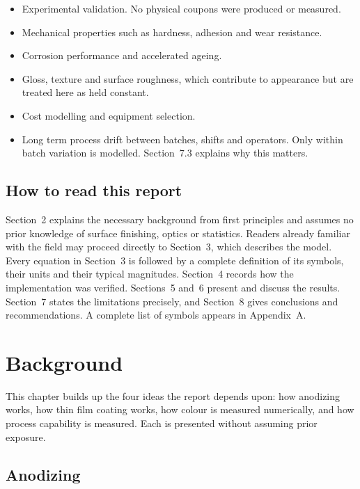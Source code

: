 \documentclass[11pt,a4paper]{article}
\begin{document}
\begin{itemize}[leftmargin=1.4em, itemsep=2pt]
\item Experimental validation. No physical coupons were produced or measured.
\item Mechanical properties such as hardness, adhesion and wear resistance.
\item Corrosion performance and accelerated ageing.
\item Gloss, texture and surface roughness, which contribute to appearance but
are treated here as held constant.
\item Cost modelling and equipment selection.
\item Long term process drift between batches, shifts and operators. Only
within batch variation is modelled. Section~7.3 explains why this matters.
\end{itemize}

\subsection{How to read this report}

Section~2 explains the necessary background from first principles and assumes
no prior knowledge of surface finishing, optics or statistics. Readers already
familiar with the field may proceed directly to Section~3, which describes the
model. Every equation in Section~3 is followed by a complete definition of its
symbols, their units and their typical magnitudes. Section~4 records how the
implementation was verified. Sections~5 and~6 present and discuss the results.
Section~7 states the limitations precisely, and Section~8 gives conclusions and
recommendations. A complete list of symbols appears in Appendix~A.

\section{Background}

This chapter builds up the four ideas the report depends upon: how anodizing
works, how thin film coating works, how colour is measured numerically, and how
process capability is measured. Each is presented without assuming prior
exposure.

\subsection{Anodizing}
\end{document}
